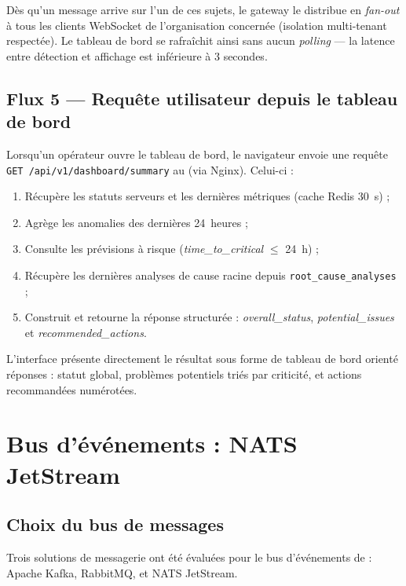 Dès qu'un message arrive sur l'un de ces sujets, le gateway le distribue en
\textit{fan-out} à tous les clients WebSocket de l'organisation concernée
(isolation multi-tenant respectée). Le tableau de bord se rafraîchit ainsi
sans aucun \textit{polling} — la latence entre détection et affichage est
inférieure à 3 secondes.

\subsection{Flux 5 — Requête utilisateur depuis le tableau de bord}

Lorsqu'un opérateur ouvre le tableau de bord, le navigateur envoie une requête
\texttt{GET /api/v1/dashboard/summary} au  (via Nginx).
Celui-ci :

\begin{enumerate}
  \item Récupère les statuts serveurs et les dernières métriques (cache Redis 30~s) ;
  \item Agrège les anomalies des dernières 24~heures ;
  \item Consulte les prévisions à risque (\textit{time\_to\_critical} $\leq$ 24~h) ;
  \item Récupère les dernières analyses de cause racine depuis
        \texttt{root\_cause\_analyses} ;
  \item Construit et retourne la réponse structurée :
        \textit{overall\_status}, \textit{potential\_issues} et
        \textit{recommended\_actions}.
\end{enumerate}

L'interface présente directement le résultat sous forme de
\og{}tableau de bord orienté réponses\fg{} : statut global, problèmes
potentiels triés par criticité, et actions recommandées numérotées.

\section{Bus d'événements : NATS JetStream}

\subsection{Choix du bus de messages}

Trois solutions de messagerie ont été évaluées pour le bus d'événements de
\caimp{} : Apache Kafka, RabbitMQ, et NATS JetStream.

